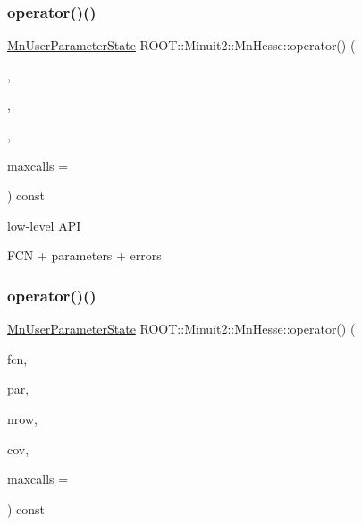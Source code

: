 \subsubsection{\texorpdfstring{operator()()}{operator()()}\hspace{0.1cm}{\footnotesize\ttfamily [3/24]}}
{\footnotesize\ttfamily \mbox{\hyperlink{classROOT_1_1Minuit2_1_1MnUserParameterState}{Mn\+User\+Parameter\+State}} R\+O\+O\+T\+::\+Minuit2\+::\+Mn\+Hesse\+::operator() (\begin{DoxyParamCaption}\item[{const \mbox{\hyperlink{classROOT_1_1Minuit2_1_1FCNBase}{F\+C\+N\+Base}} \&}]{,  }\item[{const std\+::vector$<$ double $>$ \&}]{,  }\item[{const std\+::vector$<$ double $>$ \&}]{,  }\item[{unsigned int}]{maxcalls = {} }\end{DoxyParamCaption}) const}

low-\/level A\+PI

F\+CN + parameters + errors \mbox{\label{classROOT_1_1Minuit2_1_1MnHesse_aa02f8d7bd10ea245658c9c1b3e296a45}} 
\subsubsection{\texorpdfstring{operator()()}{operator()()}\hspace{0.1cm}{\footnotesize\ttfamily [4/24]}}
{\footnotesize\ttfamily \mbox{\hyperlink{classROOT_1_1Minuit2_1_1MnUserParameterState}{Mn\+User\+Parameter\+State}} R\+O\+O\+T\+::\+Minuit2\+::\+Mn\+Hesse\+::operator() (\begin{DoxyParamCaption}\item[{const \mbox{\hyperlink{classROOT_1_1Minuit2_1_1FCNBase}{F\+C\+N\+Base}} \&}]{fcn,  }\item[{const std\+::vector$<$ double $>$ \&}]{par,  }\item[{unsigned int}]{nrow,  }\item[{const std\+::vector$<$ double $>$ \&}]{cov,  }\item[{unsigned int}]{maxcalls = {} }\end{DoxyParamCaption}) const}



